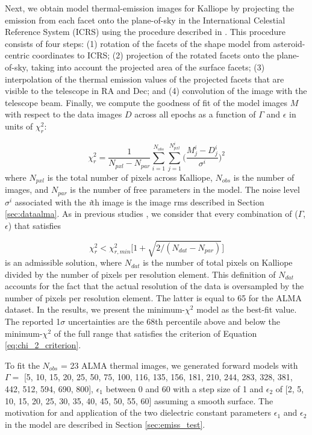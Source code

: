 \documentclass[]{aastex631}
\begin{document}
Next, we obtain model thermal-emission images for Kalliope by projecting the emission from each facet onto the plane-of-sky in the International Celestial Reference System (ICRS) using the procedure described in \citet{cambioni2022}. This procedure consists of four steps: (1) rotation of the facets of the shape model from asteroid-centric coordinates to ICRS; (2) projection of the rotated facets onto the plane-of-sky, taking into account the projected area of the surface facets; (3) interpolation of the thermal emission values of the projected facets that are visible to the telescope in RA and Dec; and 
(4) convolution of the image with the telescope beam. Finally, we compute the goodness of fit of the model images $M$ with respect to the data images $D$ across all epochs as a function of $\Gamma$ and $\epsilon$ in units of $\chi_r^2$:

\begin{equation}
\label{eq:chi_squared}
    \chi_r^2= \frac{1}{N_{pxl}-N_{par}} \sum_{i=1}^{N_{obs}} \sum_{j=1}^{N_{pxl}^i}\bigg(\frac{M_j^i-D_j^i}{\sigma^i}\bigg)^2
\end{equation}
\noindent
where $N_{pxl}$ is the total number of pixels across Kalliope, $N_{obs}$ is the number of images, and $N_{par}$ is the number of free parameters in the model. The noise level $\sigma^i$ associated with the \textit{i}th image is the image rms described in Section \ref{sec:dataalma}. As in previous studies \citep{cambioni2022}, we consider that every combination of ($\Gamma$, $\epsilon$) that satisfies 

\begin{equation}
\label{eq:chi_2_criterion}
    \chi_r^2 < \chi_{r,min}^2 \bigg[1+\sqrt{2/(N_{dat}-N_{par})}\bigg]
\end{equation}
\noindent
is an admissible solution, where $N_{dat}$ is the number of total pixels on Kalliope divided by the number of pixels per resolution element. This definition of $N_{dat}$ accounts for the fact that the actual resolution of the data is oversampled by the number of pixels per resolution element. The latter is equal to 65 for the ALMA dataset. In the results, we present the minimum-$\chi^2$ model as the best-fit value. The reported 1$\sigma$ uncertainties are the 68th percentile above and below the minimum-$\chi^2$ of the full range that satisfies the criterion of Equation \ref{eq:chi_2_criterion}.

To fit the $N_{obs}$ = 23 ALMA thermal images, we generated forward models with $\Gamma=$ [5, 10, 15, 20, 25, 50, 75, 100, 116, 135, 156, 181, 210, 244, 283, 328, 381, 442, 512, 594, 690, 800], $\epsilon_1$ between 0 and 60 with a step size of 1 and $\epsilon_2$ of [2, 5, 10, 15, 20, 25, 30, 35, 40, 45, 50, 55, 60] assuming a smooth surface. The motivation for and application of the two dielectric constant parameters $\epsilon_1$ and $\epsilon_2$ in the model are described in Section \ref{sec:emiss_test}.
\end{document}
